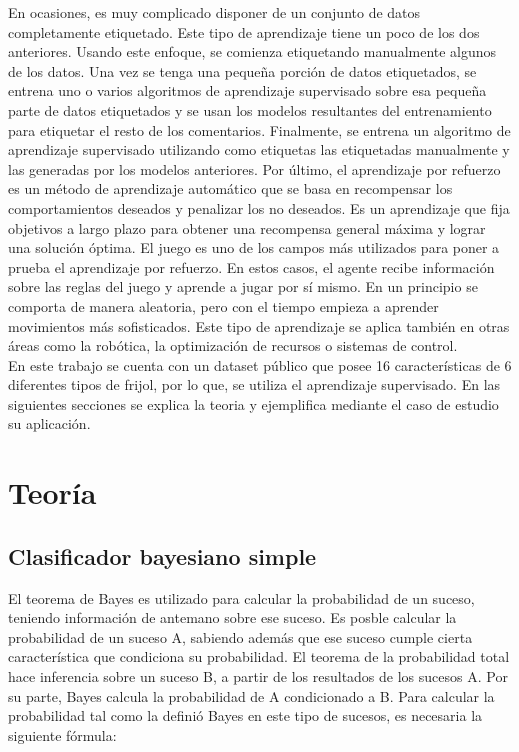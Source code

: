 \documentclass[conference]{IEEEtran}
\begin{document}
En ocasiones, es muy complicado disponer de un conjunto de datos completamente etiquetado. Este tipo de aprendizaje tiene un poco de los dos anteriores. Usando este enfoque, se comienza etiquetando manualmente algunos de los datos. Una vez se tenga una pequeña porción de datos etiquetados, se entrena uno o varios algoritmos de aprendizaje supervisado sobre esa pequeña parte de datos etiquetados y se usan los modelos resultantes del entrenamiento para etiquetar el resto de los comentarios. Finalmente, se entrena un algoritmo de aprendizaje supervisado utilizando como etiquetas las etiquetadas manualmente y las generadas por los modelos anteriores. 
Por último, el aprendizaje por refuerzo es un método de aprendizaje automático que se basa en recompensar los comportamientos deseados y penalizar los no deseados. Es un aprendizaje que fija objetivos a largo plazo para obtener una recompensa general máxima y lograr una solución óptima. El juego es uno de los campos más utilizados para poner a prueba el aprendizaje por refuerzo. En estos casos, el agente recibe información sobre las reglas del juego y aprende a jugar por sí mismo. En un principio se comporta de manera aleatoria, pero con el tiempo empieza a aprender movimientos más sofisticados.  Este tipo de aprendizaje se aplica también en otras áreas como la robótica, la optimización de recursos o sistemas de control.\\

En este trabajo se cuenta con un dataset público que posee 16 características de 6 diferentes tipos de frijol, por lo que, se utiliza el aprendizaje supervisado. En las siguientes secciones se explica la teoria y ejemplifica mediante el caso de estudio su aplicación. 

\section{Teoría}
\subsection{Clasificador bayesiano simple}
El teorema de Bayes es utilizado para calcular la probabilidad de un suceso, teniendo información de antemano sobre ese suceso. Es posble calcular la probabilidad de un suceso A, sabiendo además que ese suceso cumple cierta característica que condiciona su probabilidad. El teorema de la probabilidad total hace inferencia sobre un suceso B, a partir de los resultados de los sucesos A. Por su parte, Bayes calcula la probabilidad de A condicionado a B. Para calcular la probabilidad tal como la definió Bayes en este tipo de sucesos, es necesaria la siguiente fórmula: 
\end{document}
